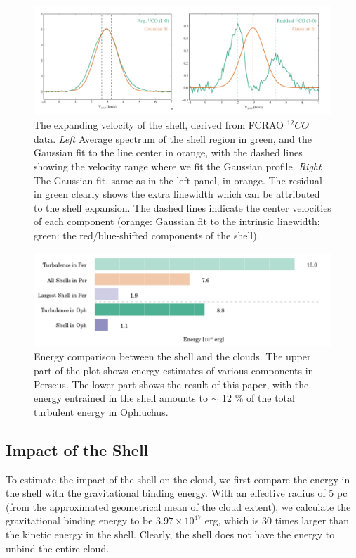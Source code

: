 \documentclass[11pt,a4paper]{emulateapj}
\begin{document}
\begin{figure}[ht]
\centering
\includegraphics[scale=0.5]{fig/v_exp}
\caption{The expanding velocity of the shell, derived from FCRAO $^{12}CO$ data. {\it Left} Average spectrum of the shell region in green, and the Gaussian fit to the line center in orange, with the dashed lines showing the velocity range where we fit the Gaussian profile. {\it Right} The Gaussian fit, same as in the left panel, in orange. The residual in green clearly shows the extra linewidth which can be attributed to the shell expansion. The dashed lines indicate the center velocities of each component (orange: Gaussian fit to the intrinsic linewidth; green: the red/blue-shifted components of the shell).
}
\end{figure}

\begin{figure}[ht]
\centering
\includegraphics[scale=0.35]{fig/bar_energy.png}
\caption{Energy comparison between the shell and the clouds. The upper part of the plot shows energy estimates of various components in Perseus. The lower part shows the result of this paper, with the energy entrained in the shell amounts to $\sim$ 12 \% of the total turbulent energy in Ophiuchus.
}
\end{figure}

\subsection{Impact of the Shell}
To estimate the impact of the shell on the cloud, we first compare the energy in the shell with the gravitational binding energy. With an effective radius of 5 pc (from the approximated geometrical mean of the cloud extent), we calculate the gravitational binding energy to be $3.97\times10^{47}$ erg, which is 30 times larger than the kinetic energy in the shell. Clearly, the shell does not have the energy to unbind the entire cloud.
\end{document}
